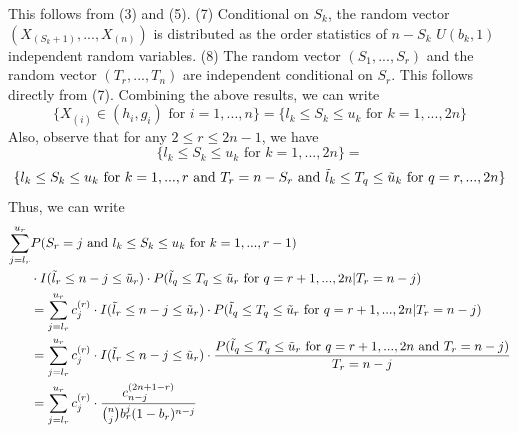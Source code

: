 \documentclass[article]{jss}
\begin{document}
%
This follows from (3) and (5). 
\newline
\newline
(7) Conditional on $S_{k}$, the random vector $(X_{(S_{k} + 1)}, ..., X_{(n)})$ is distributed as the order statistics of $n - S_{k}$ $U(b_{k}, 1)$ independent random variables.
\newline
\newline
(8) The random vector $(S_{1}, ..., S_{r})$ and the random vector $(T_{r}, ..., T_{n})$ are independent conditional on $S_{r}$. This follows directly from (7).
\newline
\newline
Combining the above results, we can write
%
\begin{equation*}
    \{X_{(i)} \in (h_{i}, g_{i}) \textrm{ for } i = 1,..., n\} = \{l_{k} \leq S_{k} \leq u_{k} \textrm{ for } k = 1, ..., 2n\}
\end{equation*}
%
Also, observe that for any $2 \leq r \leq 2n - 1$, we have
%
\begin{equation*}
    \{l_{k} \leq S_{k} \leq u_{k} \textrm{ for } k = 1, ..., 2n\} = 
\end{equation*}
%
\begin{equation*}
    \{l_{k} \leq S_{k} \leq u_{k} \textrm{ for } k = 1, ..., r \textrm{ and } T_{r} = n - S_{r} \textrm{ and } \Tilde{l}_{k} \leq T_{q} \leq \Tilde{u}_{k} \textrm{ for } q = r, ..., 2n\}
\end{equation*}
%
Thus, we can write 
%
\begin{align*}
    \sum_{j = l_{r}}^{u_{r}} &P(S_{r} = j \textrm{ and } l_{k} \leq S_{k} \leq u_{k} \textrm{ for } k = 1, ..., r - 1)\\
    &\cdot I(\Tilde{l}_{r} \leq n - j \leq \Tilde{u}_{r})
    \cdot P(\Tilde{l}_{q} \leq T_{q} \leq \Tilde{u}_{r} \textrm{ for } q = r + 1,..., 2n | T_{r} = n - j)\\
    &= \sum_{j = l_{r}}^{u_{r}} c_{j}^{(r)} \cdot I(\Tilde{l}_{r} \leq n - j \leq \Tilde{u}_{r}) \cdot P(\Tilde{l}_{q} \leq T_{q} \leq \Tilde{u}_{r} \textrm{ for } q = r + 1,..., 2n | T_{r} = n - j) \\
    &= \sum_{j = l_{r}}^{u_{r}} c_{j}^{(r)} \cdot I(\Tilde{l}_{r} \leq n - j \leq \Tilde{u}_{r}) \cdot \frac{P(\Tilde{l}_{q} \leq T_{q} \leq \Tilde{u}_{r} \textrm{ for } q = r + 1,..., 2n \textrm{ and } T_{r} = n - j)}{T_{r} = n - j} \\
    &= \sum_{j = l_{r}}^{u_{r}} c_{j}^{(r)} \cdot \frac{c_{n - j}^{(2n + 1 - r)}}{\binom{n}{j}b_{r}^{j}(1 - b_{r})^{n-j}}
\end{align*}
\end{document}
